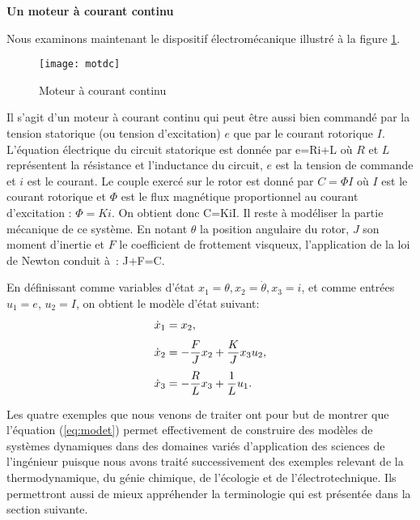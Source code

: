 \begin{exemple}{\bf Un moteur à courant continu}

Nous examinons maintenant le dispositif électromécanique illustré à la figure \ref{fig:motdc}.
\begin{figure}[ht]
\begin{center}
\texttt{[image: motdc]}
\caption{Moteur à courant continu}
\label{fig:motdc}
\end{center}
\end{figure}
Il s'agit d'un moteur à courant continu qui peut être aussi bien commandé par la tension statorique (ou tension d'excitation) $e$ que par le courant rotorique $I$.
L'équation électrique du circuit statorique est donnée par
\eqnn
e=Ri+L
\eeqnn
où $R$ et $L$ représentent la résistance et l'inductance du circuit,
$e$ est la tension de commande et $i$ est le courant. Le couple
exercé sur le rotor est donné par $C=\Phi I$ où  $I$ est le courant
rotorique et $\Phi$ est le flux magnétique 
proportionnel au courant d'excitation : $\Phi=Ki$. On obtient donc
\eqnn
C=KiI.
\eeqnn
Il reste à modéliser la partie mécanique de ce système. En notant $\theta$ la
position angulaire du rotor, $J$ son moment d'inertie et  $F$ le coefficient de
frottement visqueux, l'application de la loi de Newton conduit à~:
\eqnn
J+F=C.
\eeqnn

En définissant comme variables d'état $x_1=\theta, x_2=\dot{\theta}, x_3=i$, et
comme entrées $u_1=e$, $u_2=I$, on obtient le modèle d'état suivant:
\begin{equation} \begin{split} \label{motDC}
\dot x_1 &= x_2,  \\[0.3em]
\dot x_2 &= -\frac{F}{J}x_2+\frac{K}{J}x_3u_2, \\[0.3em]
\dot x_3 &= -\frac{R}{L}x_3+\frac{1}{L}u_1. \xqedhere{5cm}{\qed}
\end{split} \end{equation}
\end{exemple}
Les quatre exemples que nous venons de traiter ont pour but de montrer
que l'équation (\ref{eq:modet}) permet effectivement de construire des modèles de systèmes dynamiques dans des domaines variés d'application 
des sciences de l'ingénieur puisque nous avons traité successivement des exemples relevant de la thermodynamique, du génie chimique, de l'écologie et de l'électrotechnique.  Ils permettront aussi de mieux appréhender la terminologie qui est présentée dans la section suivante. 

